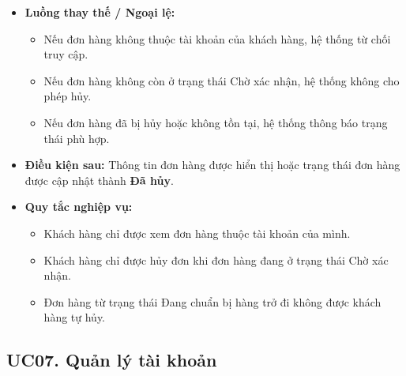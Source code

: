 \documentclass[12pt,a4paper]{article}
\begin{document}
\begin{itemize}
    \item \textbf{Luồng thay thế / Ngoại lệ:}
    \begin{itemize}
        \item Nếu đơn hàng không thuộc tài khoản của khách hàng, hệ thống từ chối truy cập.
        \item Nếu đơn hàng không còn ở trạng thái Chờ xác nhận, hệ thống không cho phép hủy.
        \item Nếu đơn hàng đã bị hủy hoặc không tồn tại, hệ thống thông báo trạng thái phù hợp.
    \end{itemize}

    \item \textbf{Điều kiện sau:} Thông tin đơn hàng được hiển thị hoặc trạng thái đơn hàng được cập nhật thành \textbf{Đã hủy}.

    \item \textbf{Quy tắc nghiệp vụ:}
    \begin{itemize}
        \item Khách hàng chỉ được xem đơn hàng thuộc tài khoản của mình.
        \item Khách hàng chỉ được hủy đơn khi đơn hàng đang ở trạng thái Chờ xác nhận.
        \item Đơn hàng từ trạng thái Đang chuẩn bị hàng trở đi không được khách hàng tự hủy.
    \end{itemize}

\end{itemize}

\subsection*{UC07. Quản lý tài khoản}
\end{document}
